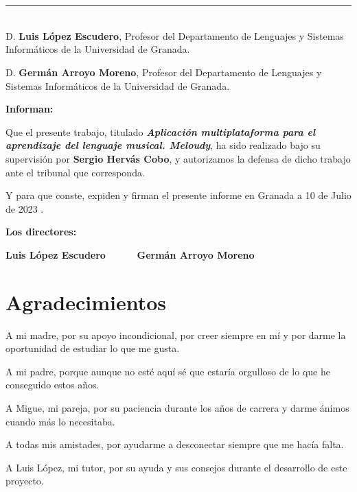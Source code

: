 \chapter*{}
\thispagestyle{empty}

\noindent\rule[-1ex]{\textwidth}{2pt}\\[4.5ex]

D. \textbf{Luis López Escudero}, Profesor del Departamento de Lenguajes y Sistemas Informáticos de la Universidad de Granada.

\vspace{0.5cm}

D. \textbf{Germán Arroyo Moreno}, Profesor del Departamento de Lenguajes y Sistemas Informáticos de la Universidad de Granada.


\vspace{0.5cm}

\textbf{Informan:}

\vspace{0.5cm}

Que el presente trabajo, titulado \textit{\textbf{Aplicación multiplataforma para el aprendizaje del lenguaje musical. Meloudy}},
ha sido realizado bajo su supervisión por \textbf{Sergio Hervás Cobo}, y autorizamos la defensa de dicho trabajo ante el tribunal
que corresponda.

\vspace{0.5cm}

Y para que conste, expiden y firman el presente informe en Granada a 10 de Julio de 2023 .

\vspace{1cm}

\textbf{Los directores:}

\vspace{5cm}

\noindent \textbf{Luis López Escudero \ \ \ \ \ Germán Arroyo Moreno}

\chapter*{Agradecimientos}
\thispagestyle{empty}

       \vspace{1cm}

A mi madre, por su apoyo incondicional, por creer siempre en mí y por darme la oportunidad de estudiar lo que me gusta.

A mi padre, porque aunque no esté aquí sé que estaría orgulloso de lo que he conseguido estos años.

A Migue, mi pareja, por su paciencia durante los años de carrera y darme ánimos cuando más lo necesitaba. 

A todas mis amistades, por ayudarme a desconectar siempre que me hacía falta.

A Luis López, mi tutor, por su ayuda y sus consejos durante el desarrollo de este proyecto. 